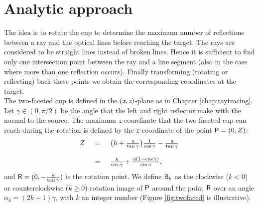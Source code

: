 \section{Analytic approach}
The idea is to rotate the cup to determine the maximum number of reflections between a ray and the optical lines before reaching the target. The rays are considered to be straight lines instead of broken lines. Hence it is sufficient to find only one intersection point between the ray and a line segment (also in the case where more than one reflection occurs). Finally transforming (rotating or reflecting) back these points we obtain the corresponding coordinates at the target.\\ \indent
The two-faceted cup is defined in the $(\textit{x}, \textit{z})$-plane as in Chapter \ref{chap:raytracing}. 
Let $\gamma\in(0, \pi/2)$ be the angle that the left and right reflector make with the normal to the source. 
The maximum $\textit{z}$-coordinate that the two-faceted cup can reach during the rotation is defined by the $\textit{z}$-coordinate of the point $\textsf{P}=(0,Z)$:
\begin{equation}\label{rotation}\begin{tabular}{llll}
$Z$ & $=$ & $ \big(h+\frac{\variabile{a}}{\tan\gamma}\big)\frac{1}{\cos\gamma}-\frac{\variabile{a}}{\tan\gamma}$ \\ $ \quad$ & $ \quad $ & $ \quad $ \\$ \quad$ &  $=$ & $\frac{h}{\cos\gamma}+\frac{\variabile{a}(1-\cos\gamma)}{\sin\gamma},$\end{tabular}
\end{equation} and $\textsf{R}=(0,-\frac{\textit{a}}{\tan\gamma})$ is the rotation point. We define $\textsf{B}_k$ as the clockwise ($k<0$) or counterclockwise ($k\geq 0$) rotation image of $\textsf{P}$ around the point $\textsf{R}$ over an angle $\alpha_k=(2k+1)\gamma$, with $k$ an integer number (Figure \ref{fig:twofaced} is illustrative).
